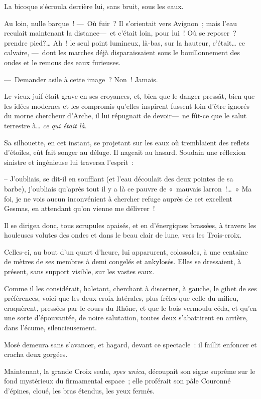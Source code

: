 \documentclass[french,twoside]{book} %
\begin{document}
   La bicoque s’écroula derrière lui, sans bruit, sous les eaux.\par
Au loin, nulle barque ! — Où fuir ? Il s’orientait vers Avignon ; mais l’eau reculait maintenant la distance— et c’était loin, pour lui ! Où se reposer ? prendre pied?… Ah ! le seul point lumineux, là-bas, sur la hauteur, c’était… ce calvaire, — dont les marches déjà disparaissaient sous le bouillonnement des ondes et le remous des eaux furieuses.\par
— Demander asile à cette image ? Non ! Jamais.\par
Le vieux juif était grave en ses croyances, et, bien que le danger pressât, bien que les idées modernes et les compromis qu’elles inspirent fussent loin d’être ignorés du morne chercheur d’Arche, il lui répugnait de devoir— ne fût-ce que le salut terrestre à… \emph{ce qui était là}.\par
Sa silhouette, en cet instant, se projetant sur les eaux où tremblaient des reflets d’étoiles, eût fait songer au déluge. Il nageait au hasard. Soudain une réflexion sinistre et ingénieuse lui traversa l’esprit :\par
   – J’oubliais, se dit-il en soufflant (et l’eau découlait des deux pointes de sa barbe), j’oubliais qu’après tout il y a là ce pauvre de « mauvais larron !… » Ma foi, je ne vois aucun inconvénient à chercher refuge auprès de cet excellent Gesmas, en attendant qu’on vienne me délivrer !\par
Il se dirigea donc, tous scrupules apaisés, et en d’énergiques brassées, à travers les houleuses volutes des ondes et dans le beau clair de lune, vers les Trois-croix.\par
Celles-ci, au bout d’un quart d’heure, lui apparurent, colossales, à une centaine de mètres de ses membres à demi congelés et ankylosés. Elles se dressaient, à présent, sans support visible, sur les vastes eaux.\par
Comme il les considérait, haletant, cherchant à discerner, à gauche, le gibet de ses préférences, voici que les deux croix latérales, plus frêles que celle du milieu, craquèrent, pressées par le cours du Rhône, et que le bois vermoulu céda, et qu’en une sorte d’épouvantée, de noire salutation, toutes deux s’abattirent en arrière, dans l’écume, silencieusement.\par
   Mosé demeura sans s’avancer, et hagard, devant ce spectacle : il faillit enfoncer et cracha deux gorgées.\par
Maintenant, la grande Croix seule, \emph{spes unica}, découpait son signe suprême sur le fond mystérieux du firmamental espace ; elle proférait son pâle Couronné d’épines, cloué, les bras étendus, les yeux fermés.\par
\end{document}
